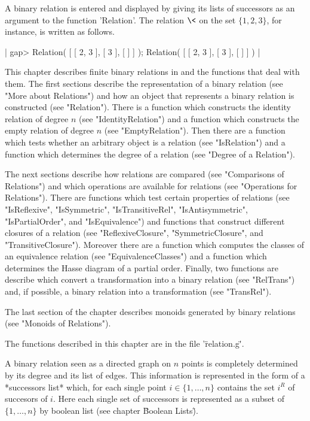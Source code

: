 A  binary relation is   entered  and displayed by    giving its lists  of
successors as an argument to the function  'Relation'.  The relation $\<$
on the set $\{1, 2, 3\}$, for instance, is written as follows.

|    gap> Relation( [ [ 2, 3 ], [ 3 ], [ ] ] );
    Relation( [ [ 2, 3 ], [ 3 ], [  ] ] ) |

This  chapter   describes finite binary    relations in  {\GAP}  and  the
functions  that deal  with them.     The   first sections describe    the
representation of a binary relation (see  "More about Relations") and how
an  object  that  represents   a  binary relation   is constructed   (see
"Relation").  There is a  function which constructs the identity relation
of  degree $n$ (see  "IdentityRelation") and a  function which constructs
the empty relation of degree $n$ (see "EmptyRelation").  Then there are a
function   which tests whether  an  arbitrary object  is  a relation (see
"IsRelation") and  a function which  determines the  degree of a relation
(see "Degree of a Relation").

The next  sections describe how relations  are compared (see "Comparisons
of  Relations")  and which operations  are  available for  relations (see
"Operations for Relations").   There  are  functions which  test  certain
properties  of   relations   (see     "IsReflexive",       "IsSymmetric",
"IsTransitiveRel",    "IsAntisymmetric",    "IsPartialOrder",         and
"IsEquivalence")  and functions that  construct  different closures of  a
relation     (see   "ReflexiveClosure",     "SymmetricClosure",       and
"TransitiveClosure").  Moreover there are a  function which computes  the
classes  of  an  equivalence  relation (see "EquivalenceClasses")   and a
function which determines the Hasse diagram of a partial order.  Finally,
two functions are  describe which convert a  transformation into a binary
relation (see  "RelTrans") and, if   possible, a binary relation  into  a
transformation (see "TransRel").

The last  section of  the  chapter describes monoids generated  by binary
relations (see "Monoids of Relations").

The functions described in this chapter are in the file '\"relation.g\"'.


A binary relation  seen as a  directed graph on  $n$ points is completely
determined  by its degree  and  its list  of edges.   This information is
represented in the  form  of a  *successors list* which,  for each single
point $i \in \{1, \dots, n\}$ contains the set $i^R$ of succesors of $i$.
Here each single set  of successors is represented  as a subset  of $\{1,
\dots, n\}$ by boolean list (see chapter \"Boolean Lists\").

